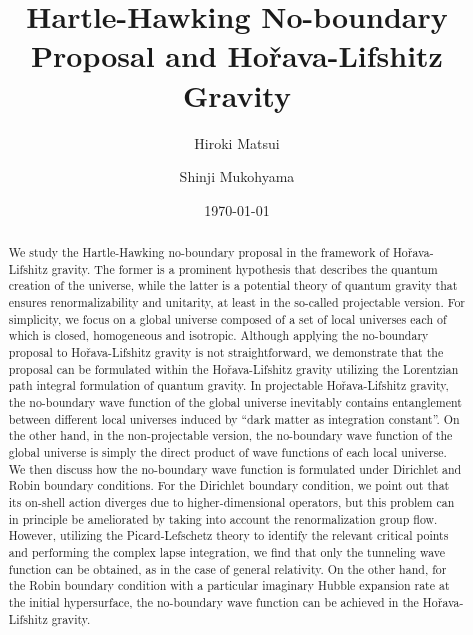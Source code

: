 \documentclass[superscriptaddress,aps,preprintnumbers,nofootinbib]{revtex4-2}
\begin{document}

\title{
Hartle-Hawking No-boundary Proposal and Ho\v{r}ava-Lifshitz Gravity}

\author{Hiroki Matsui}
\author{Shinji Mukohyama}


\begin{abstract}
We study the Hartle-Hawking no-boundary proposal in the framework of Ho\v{r}ava-Lifshitz gravity. The former is a prominent hypothesis that describes the quantum creation of the universe, while the latter is a potential theory of quantum gravity that ensures renormalizability and unitarity, at least in the so-called projectable version. For simplicity, we focus on a global universe composed of a set of local universes each of which is closed, homogeneous and isotropic. Although applying the no-boundary proposal to Ho\v{r}ava-Lifshitz gravity is not straightforward, we demonstrate that the proposal can be formulated within the Ho\v{r}ava-Lifshitz gravity utilizing the Lorentzian path integral formulation of quantum gravity. In projectable Ho\v{r}ava-Lifshitz gravity, the no-boundary wave function of the global universe inevitably contains entanglement between different local universes induced by ``dark matter as integration constant''. On the other hand, in the non-projectable version, the no-boundary wave function of the global universe is simply the direct product of wave functions of each local universe. We then discuss how the no-boundary wave function is formulated under Dirichlet and Robin boundary conditions. For the Dirichlet boundary condition, we point out that its on-shell action diverges due to higher-dimensional operators, but this problem can in principle be ameliorated by taking into account the renormalization group flow. However, utilizing the Picard-Lefschetz theory to identify the relevant critical points and performing the complex lapse integration, we find that only the tunneling wave function can be obtained, as in the case of general relativity. On the other hand, for the Robin boundary condition with a particular imaginary Hubble expansion rate at the initial hypersurface, the no-boundary wave function can be achieved in the Ho\v{r}ava-Lifshitz gravity. 
\end{abstract}
\date{\today}
\maketitle
\end{document}
